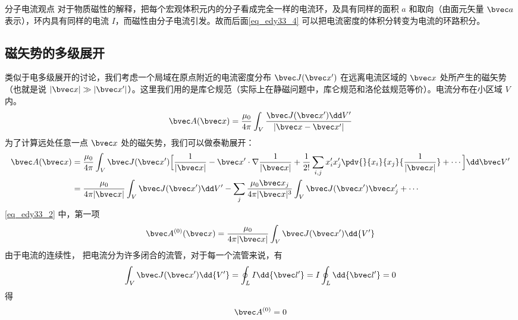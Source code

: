 
\begin{lemma}{分子电流观点}
对于物质磁性的解释，把每个宏观体积元内的分子看成完全一样的电流环，及具有同样的面积 $a$ 和取向（由面元矢量 $\bvec a$ 表示），环内具有同样的电流 $I$，而磁性由分子电流引发。故而后面\autoref{eq_edy33_4} 可以把电流密度的体积分转变为电流的环路积分。
\end{lemma}
\subsection{磁矢势的多级展开}
类似于电多级展开的讨论，我们考虑一个局域在原点附近的电流密度分布 $\bvec J(\bvec x')$ 在远离电流区域的 $\bvec x$ 处所产生的磁矢势（也就是说 $|\bvec x|\gg|\bvec x'|$）。这里我们用的是库仑规范（实际上在静磁问题中，库仑规范和洛伦兹规范等价）。电流分布在小区域 $V$ 内。
\begin{equation}
\bvec A(\bvec x)=\dfrac {\mu_0}{4\pi} \int_V \dfrac{ \bvec J(\bvec x^{\prime})\dd V^{\prime}}{|\bvec x - \bvec x'|}\label{eq_edy33_1}
\end{equation}
为了计算远处任意一点 $\bvec x$ 处的磁矢势，我们可以做泰勒展开：
\begin{equation}\label{eq_edy33_2}
\begin{aligned}
\bvec A(\bvec x)&=\dfrac {\mu_0}{4\pi}\int_V \bvec J(\bvec x')\Big[\dfrac{1}{|\bvec x|}-\bvec x'\cdot\nabla \dfrac{1}{|\bvec x|}+\dfrac{1}{2!}\sum_{i,j}x_i^{\prime}x_j^{\prime}\pdv{}{x_i}{x_j}{\dfrac 1 {|\bvec x|}}+\cdots\Big]\dd \bvec V^{\prime}
\\
&=\dfrac{\mu_0}{4\pi|\bvec x|}\int_V \bvec J(\bvec x')\dd V'
-\sum_{j}\dfrac{\mu_0 \bvec x_j}{4\pi |\bvec x|^3}\int_V \bvec J(\bvec x')\bvec x'_j + \cdots
\end{aligned}
\end{equation}
\autoref{eq_edy33_2} 中，第一项
\begin{equation}
\bvec A^{(0)}(\bvec x)=\dfrac {\mu_0}{4\pi |\bvec x|}\int_V \bvec J(\bvec x')\dd{ V^{\prime}}\label{eq_edy33_3}
\end{equation}
由于电流的连续性，%
把电流分为许多闭合的流管，对于每一个流管来说，有
\begin{equation}
\int_V \bvec J(\bvec x^{\prime}) \dd{V^{\prime}}=\oint_L I\dd{\bvec l'}=I\oint_L \dd{\bvec l'}=0\label{eq_edy33_4}
\end{equation}
得\begin{equation}
\bvec A^{(0)}=0\label{eq_edy33_5}
\end{equation}
